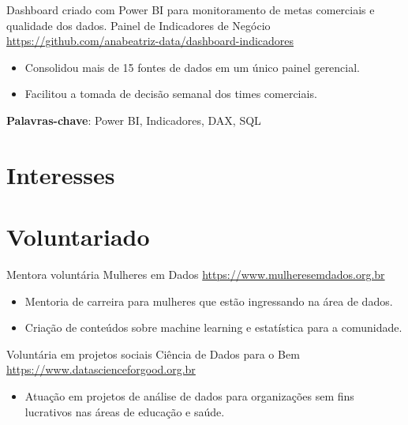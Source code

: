 \documentclass[a4paper, serif, 10pt]{moderncv}
\begin{document}
        {Dashboard criado com Power BI para monitoramento de metas comerciais e qualidade dos dados.}
        {Painel de Indicadores de Negócio}
        {\url{https://github.com/anabeatriz-data/dashboard-indicadores}}
        {}
        {\begin{itemize}
\item Consolidou mais de 15 fontes de dados em um único painel gerencial.
\item Facilitou a tomada de decisão semanal dos times comerciais.
\end{itemize}
\textbf{Palavras-chave}: Power BI, Indicadores, DAX, SQL}
\section{Interesses}

\section{Voluntariado}

        {Mentora voluntária}
        {Mulheres em Dados}
        {\url{https://www.mulheresemdados.org.br}}
        {}
        {\begin{itemize}
\item Mentoria de carreira para mulheres que estão ingressando na área de dados.
\item Criação de conteúdos sobre machine learning e estatística para a comunidade.
\end{itemize}}


        {Voluntária em projetos sociais}
        {Ciência de Dados para o Bem}
        {\url{https://www.datascienceforgood.org.br}}
        {}
        {\begin{itemize}
\item Atuação em projetos de análise de dados para organizações sem fins lucrativos nas áreas de educação e saúde.
\end{itemize}}
\end{document}
